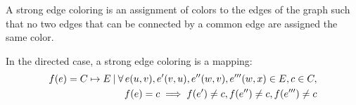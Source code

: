 \begin{defi}

A strong edge coloring is an assignment of colors to the edges of the graph such that no two edges that can be connected by a common edge are assigned the same color. 

In the directed case, a strong edge coloring is a mapping:
  \begin{align*} 
    f(e) = C \mapsto E {\: |\:} \forall\, e(u,v), e'(v,u), e''(w,v), e'''(w,x) \in E, c \in C,\\ 
    f(e) = c \implies f(e') \ne c, f(e'') \ne c, f(e''') \ne c 
  \end{align*} 
\end{defi}

